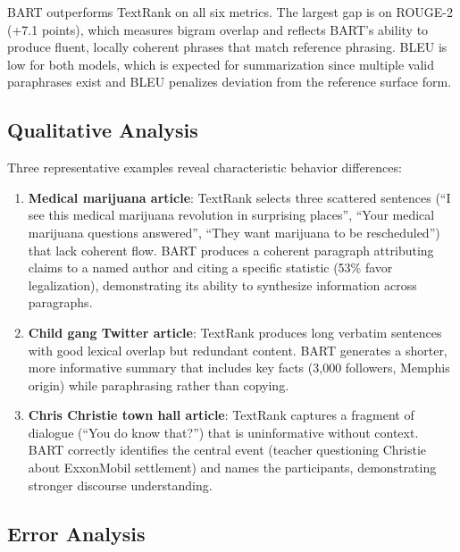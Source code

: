 \documentclass[12pt,a4paper]{article}
\begin{document}
BART outperforms TextRank on all six metrics. The largest gap is on ROUGE-2 (+7.1 points), which measures bigram overlap and reflects BART's ability to produce fluent, locally coherent phrases that match reference phrasing. BLEU is low for both models, which is expected for summarization since multiple valid paraphrases exist and BLEU penalizes deviation from the reference surface form.

\subsection{Qualitative Analysis}

Three representative examples reveal characteristic behavior differences:

\begin{enumerate}
    \item \textbf{Medical marijuana article}: TextRank selects three scattered sentences (``I see this medical marijuana revolution in surprising places'', ``Your medical marijuana questions answered'', ``They want marijuana to be rescheduled'') that lack coherent flow. BART produces a coherent paragraph attributing claims to a named author and citing a specific statistic (53\% favor legalization), demonstrating its ability to synthesize information across paragraphs.

    \item \textbf{Child gang Twitter article}: TextRank produces long verbatim sentences with good lexical overlap but redundant content. BART generates a shorter, more informative summary that includes key facts (3{,}000 followers, Memphis origin) while paraphrasing rather than copying.

    \item \textbf{Chris Christie town hall article}: TextRank captures a fragment of dialogue (``You do know that?'') that is uninformative without context. BART correctly identifies the central event (teacher questioning Christie about ExxonMobil settlement) and names the participants, demonstrating stronger discourse understanding.
\end{enumerate}

\subsection{Error Analysis}
\end{document}
